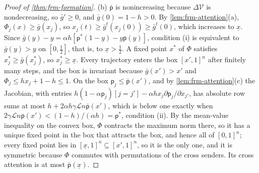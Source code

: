 \begin{proof}[Proof of \cref{thm:frm-formation}]
(b) $\bar{\mathsf p}$ is nonincreasing because $\Delta\mathcal V$ is nondecreasing, so $\bar g'\ge0$, and $\bar g(0)=1-h>0$. By \cref{lem:frm-attention}(a), $\Phi_j(x)\ge\bar g(x_j)$, so $x_j(t)\ge\bar g^t(x_j(0))\ge\bar g^t(0)$, which increases to $\underline x$. Since $\bar g(y)-y=\alpha h[\mathsf p^\ast(1-y)-y\bar{\mathsf p}(y)]$, condition (i) is equivalent to $\bar g(y)>y$ on $[0,\frac12]$, that is, to $\underline x>\frac12$. A fixed point $x^\ast$ of $\Phi$ satisfies $x^\ast_j\ge\bar g(x^\ast_j)$, so $x^\ast_j\ge\underline x$. Every trajectory enters the box $[x',1]^n$ after finitely many steps, and the box is invariant because $\bar g(x')>x'$ and $\Phi_j\le hx_j+1-h\le1$. On the box $\mathsf p_j\le\bar{\mathsf p}(x')$, and by \cref{lem:frm-attention}(c) the Jacobian, with entries $h(1-\alpha\mathsf p_j)[j=j']-\alpha hx_j\partial\mathsf p_j/\partial x_{j'}$, has absolute row sums at most $h+2\alpha h\gamma\mathcal Ln\bar{\mathsf p}(x')$, which is below one exactly when $2\gamma\mathcal Ln\bar{\mathsf p}(x')<(1-h)/(\alpha h)=\mathsf p^\ast$, condition (ii). By the mean-value inequality on the convex box, $\Phi$ contracts the maximum norm there, so it has a unique fixed point in the box that attracts the box, and hence all of $[0,1]^n$; every fixed point lies in $[\underline x,1]^n\subseteq[x',1]^n$, so it is the only one, and it is symmetric because $\Phi$ commutes with permutations of the cross senders. Its cross attention is at most $\bar{\mathsf p}(\underline x)$.


\end{proof}
